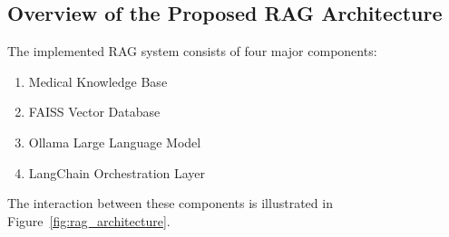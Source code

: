 \subsection{Overview of the Proposed RAG Architecture}

The implemented RAG system consists of four major components:

\begin{enumerate}
	\item Medical Knowledge Base
	\item FAISS Vector Database
	\item Ollama Large Language Model
	\item LangChain Orchestration Layer
\end{enumerate}

The interaction between these components is illustrated in Figure~\ref{fig:rag_architecture}.

